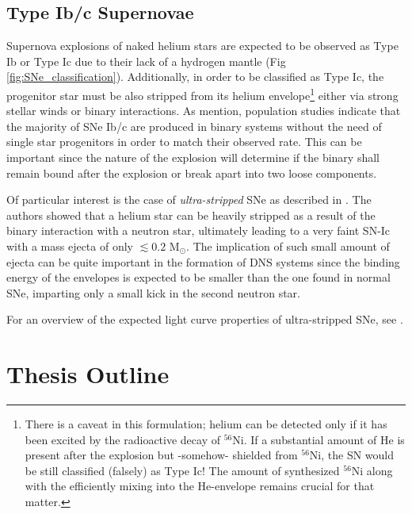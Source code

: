 \documentclass[../../main/thesis_msc.tex]{subfiles}
\begin{document}
				
			\subsection{Type Ib/c Supernovae}
			
				Supernova explosions of naked helium stars are expected to be observed as Type Ib or Type Ic due to their lack of a hydrogen mantle (Fig \ref{fig:SNe_classification}). Additionally, in order to be classified as Type Ic, the progenitor star must be also stripped from its helium envelope\footnote{There is a caveat in this formulation; helium can be detected only if it has been excited by the radioactive decay of $^{56}$Ni. If a substantial amount of He is present after the explosion but -somehow- shielded from $^{56}$Ni, the SN would be still classified (falsely) as Type Ic! The amount of synthesized $^{56}$Ni along with the efficiently mixing into the He-envelope remains crucial for that matter.} either via strong stellar winds or binary interactions. As \cite{Yoon2010} mention, population studies indicate that the majority of SNe Ib/c are produced in binary systems without the need of single star progenitors in order to match their observed rate. This can be important since the nature of the explosion will determine if the binary shall remain bound after the explosion or break apart into two loose components.
				
				Of particular interest is the case of \emph{ultra-stripped} SNe as described in \cite{Tauris_ultra, Tauris2013}. The authors showed that a helium star can be heavily stripped as a result of the binary interaction with a neutron star, ultimately leading to a very faint SN-Ic with a mass ejecta of only $\lesssim 0.2$ M$_{\odot}$. The implication of such small amount of ejecta can be quite important in the formation of DNS systems since the binding energy of the envelopes is expected to be smaller than the one found in normal SNe, imparting only a small kick in the second neutron star.
				
				For an overview of the expected light curve properties of ultra-stripped SNe, see \cite{Moriya2017}.
				
		\section{Thesis Outline}
		
\end{document}
